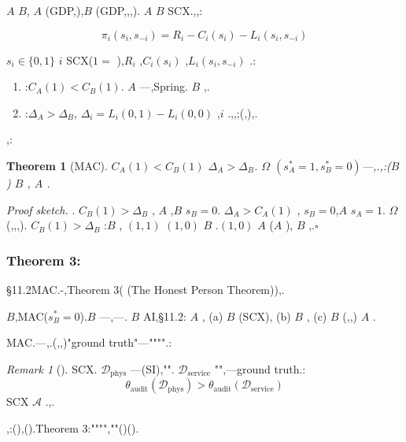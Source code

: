 \documentclass[12pt,a4paper]{article}
\newtheorem{theorem}{Theorem}[section]
\theoremstyle{definition}
\theoremstyle{remark}
\newtheorem{remark}{Remark}[section]
\begin{document}
 $A$  $B$, $A$ (GDP,),$B$ (GDP,,,). $A$  $B$ SCX.,,:

\begin{equation}
\pi_i(s_i, s_{-i}) = R_i - C_i(s_i) - L_i(s_i, s_{-i})
\end{equation}

 $s_i \in \{0, 1\}$  $i$ SCX($1 = $ ),$R_i$ ,$C_i(s_i)$ ,$L_i(s_i, s_{-i})$ .:

\begin{enumerate}[label=(\roman*)]
    \item \textbf{}:$C_A(1) < C_B(1)$. $A$ ---,Spring. $B$ ,.
    \item \textbf{}:$\Delta_A > \Delta_B$, $\Delta_i = L_i(0, 1) - L_i(0, 0)$ ,$i$ .,,;(,),.
\end{enumerate}

,:

\begin{theorem}[MAC]
\label{thm:mac-asymmetric}
 $C_A(1) < C_B(1)$  $\Delta_A > \Delta_B$. $\Omega$  $(s_A^* = 1, s_B^* = 0)$---,.,:($B$ ) $B$ , $A$ .
\end{theorem}

\textit{Proof sketch.} . $C_B(1) > \Delta_B$ , $A$ ,$B$  $s_B = 0$. $\Delta_A > C_A(1)$ , $s_B = 0$,$A$  $s_A = 1$. $\Omega$ (,,,). $C_B(1) > \Delta_B$ :$B$ , $(1, 1)$  $(1, 0)$  $B$ .$(1, 0)$  $A$ ($A$ ), $B$ ,.\hfill $\square$

\subsubsection*{Theorem 3:}

§11.2MAC.-,Theorem 3( (The Honest Person Theorem)),.

 $B$,MAC($s_B^* = 0$).$B$ ---,---. $B$ AI,§11.2: $A$ , (a) $B$ (SCX), (b) $B$ , (c) $B$ \textit{}(,,) $A$ .

MAC.---,.(,,)"ground truth"---"""".:

\begin{remark}[]
SCX\textit{}. $\mathcal{D}_{\text{phys}}$ ---(SI),"". $\mathcal{D}_{\text{service}}$ "",---ground truth.:
\begin{equation}
\theta_{\text{audit}}(\mathcal{D}_{\text{phys}}) > \theta_{\text{audit}}(\mathcal{D}_{\text{service}})
\end{equation}
SCX $\mathcal{A}$ .,.
\end{remark}

,:(),\textit{}().Theorem 3:"""",""()().

\subsubsection*{}
\end{document}
